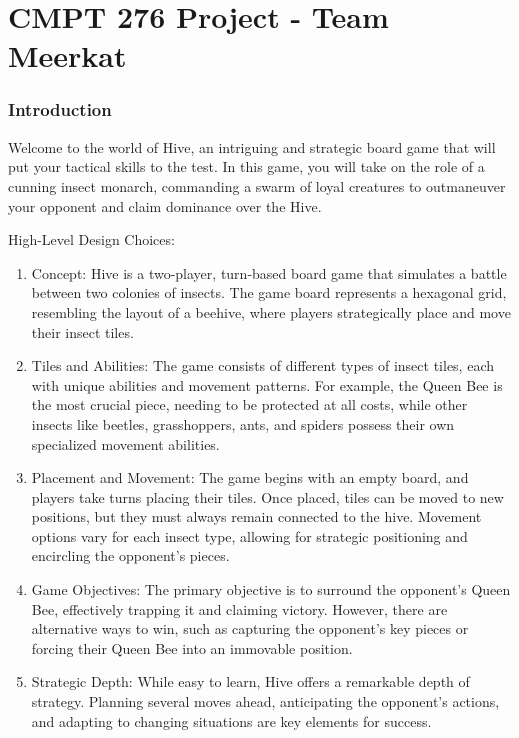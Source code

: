 \documentclass[
]{article}
\author{}
\date{}
\begin{document}
\hypertarget{cmpt-276-project---team-meerkat}{%
\section{CMPT 276 Project - Team
Meerkat}\label{cmpt-276-project---team-meerkat}}

\hypertarget{introduction}{%
\subsubsection{Introduction}\label{introduction}}

Welcome to the world of Hive, an intriguing and strategic board game
that will put your tactical skills to the test. In this game, you will
take on the role of a cunning insect monarch, commanding a swarm of
loyal creatures to outmaneuver your opponent and claim dominance over
the Hive.

High-Level Design Choices:

\begin{enumerate}
\def\labelenumi{\arabic{enumi}.}
\item
  Concept: Hive is a two-player, turn-based board game that simulates a
  battle between two colonies of insects. The game board represents a
  hexagonal grid, resembling the layout of a beehive, where players
  strategically place and move their insect tiles.
\item
  Tiles and Abilities: The game consists of different types of insect
  tiles, each with unique abilities and movement patterns. For example,
  the Queen Bee is the most crucial piece, needing to be protected at
  all costs, while other insects like beetles, grasshoppers, ants, and
  spiders possess their own specialized movement abilities.
\item
  Placement and Movement: The game begins with an empty board, and
  players take turns placing their tiles. Once placed, tiles can be
  moved to new positions, but they must always remain connected to the
  hive. Movement options vary for each insect type, allowing for
  strategic positioning and encircling the opponent's pieces.
\item
  Game Objectives: The primary objective is to surround the opponent's
  Queen Bee, effectively trapping it and claiming victory. However,
  there are alternative ways to win, such as capturing the opponent's
  key pieces or forcing their Queen Bee into an immovable position.
\item
  Strategic Depth: While easy to learn, Hive offers a remarkable depth
  of strategy. Planning several moves ahead, anticipating the opponent's
  actions, and adapting to changing situations are key elements for
  success.
\end{enumerate}
\end{document}
